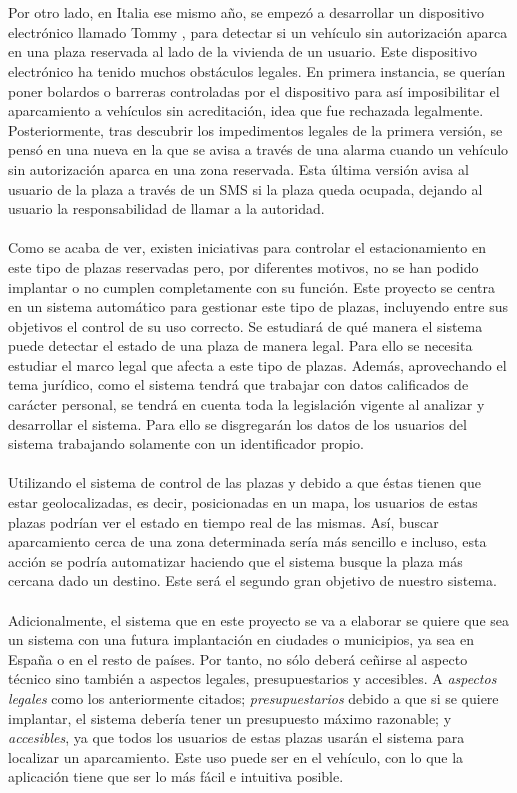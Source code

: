\\\\
Por otro lado, en Italia ese mismo año, se empezó a desarrollar un dispositivo electrónico llamado Tommy \cite{tommy}, para detectar si un vehículo sin autorización aparca en una plaza reservada al lado de la vivienda de un usuario. Este dispositivo electrónico ha tenido muchos obstáculos legales. En primera instancia, se querían poner bolardos o barreras controladas por el dispositivo para así imposibilitar el aparcamiento a vehículos sin acreditación, idea que fue rechazada legalmente. Posteriormente, tras descubrir los impedimentos legales de la primera versión, se pensó en una nueva en la que se avisa a través de una alarma cuando un vehículo sin autorización aparca en una zona reservada. Esta última versión avisa al usuario de la plaza a través de un SMS si la plaza queda ocupada, dejando al usuario la responsabilidad de llamar a la autoridad. 
\\\\
Como se acaba de ver, existen iniciativas para controlar el estacionamiento en este tipo de plazas reservadas pero, por diferentes motivos, no se han podido implantar o no cumplen completamente con su función. Este proyecto se centra en un sistema automático para gestionar este tipo de plazas, incluyendo entre sus objetivos el control de su uso correcto. Se estudiará de qué manera el sistema puede detectar el estado de una plaza de manera legal. Para ello se necesita estudiar el marco legal que afecta a este tipo de plazas. Además, aprovechando el tema jurídico, como el sistema tendrá que trabajar con datos calificados de carácter personal, se tendrá en cuenta toda la legislación vigente al analizar y desarrollar el sistema. Para ello se disgregarán los datos de los usuarios del sistema trabajando solamente con un identificador propio.
\\\\
Utilizando el sistema de control de las plazas y debido a que éstas tienen que estar geolocalizadas, es decir, posicionadas en un mapa, los usuarios de estas plazas podrían ver el estado en tiempo real de las mismas. Así, buscar aparcamiento cerca de una zona determinada sería más sencillo e incluso, esta acción se podría automatizar haciendo que el sistema busque la plaza más cercana dado un destino. Este será el segundo gran objetivo de nuestro sistema.
\\\\
Adicionalmente, el sistema que en este proyecto se va a elaborar se quiere que sea un sistema con una futura implantación en ciudades o municipios, ya sea en España o en el resto de países. Por tanto, no sólo deberá ceñirse al aspecto técnico sino también a aspectos legales, presupuestarios y accesibles. A \textit{aspectos legales} como los anteriormente citados; \textit{presupuestarios} debido a que si se quiere implantar, el sistema debería tener un presupuesto máximo razonable; y \textit{accesibles}, ya que todos los usuarios de estas plazas usarán el sistema para localizar un aparcamiento. Este uso puede ser en el vehículo, con lo que la aplicación tiene que ser lo más fácil e intuitiva posible.
